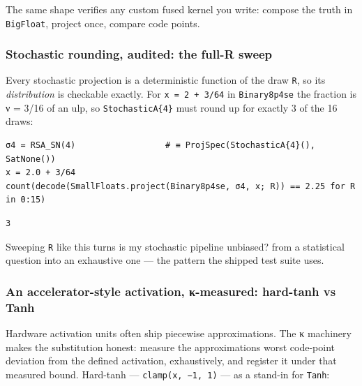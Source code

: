 The same shape verifies any custom fused kernel you write: compose the truth in \texttt{BigFloat}, project once, compare code points.



\subsubsection{Stochastic rounding, audited: the full-R sweep}



\label{6013932738708787830}{}


Every stochastic projection is a deterministic function of the draw \texttt{R}, so its \emph{distribution} is checkable exactly. For \texttt{x = 2 + 3/64} in \texttt{Binary8p4se} the fraction is ν = 3/16 of an ulp, so \texttt{StochasticA\{4\}} must round up for exactly 3 of the 16 draws:




\nopagebreak[4]
\begin{minipage}{\linewidth}
\begin{verbatim}
σ4 = RSA_SN(4)                  # ≡ ProjSpec(StochasticA{4}(), SatNone())
x = 2.0 + 3/64
count(decode(SmallFloats.project(Binary8p4se, σ4, x; R)) == 2.25 for R in 0:15)
\end{verbatim}




\begin{verbatim}
3
\end{verbatim}
\end{minipage}




Sweeping \texttt{R} like this turns {\textquotedbl}is my stochastic pipeline unbiased?{\textquotedbl} from a statistical question into an exhaustive one — the pattern the shipped test suite uses.



\subsubsection{An accelerator-style activation, κ-measured: hard-tanh vs Tanh}



\label{7978642076077323668}{}


Hardware activation units often ship piecewise approximations. The κ machinery makes the substitution honest: measure the approximation{\textquotesingle}s worst code-point deviation from the defined activation, exhaustively, and register it under that measured bound. Hard-tanh — \texttt{clamp(x, −1, 1)} — as a stand-in for \texttt{Tanh}:




